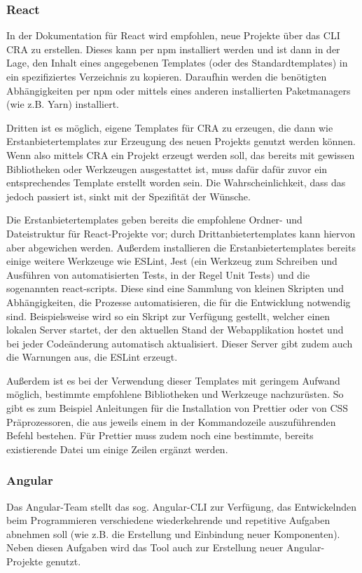 \subsubsection{React}
In der Dokumentation für React wird empfohlen, neue Projekte über das \gls{CLI} \gls{CRA} zu erstellen. Dieses kann per \gls{npm} installiert werden und ist dann in der Lage, den Inhalt eines angegebenen Templates (oder des Standardtemplates) in ein spezifiziertes Verzeichnis zu kopieren. Daraufhin werden die benötigten Abhängigkeiten per \gls{npm} oder mittels eines anderen installierten Paketmanagers (wie z.B. Yarn) installiert.

Dritten ist es möglich, eigene Templates für \gls{CRA} zu erzeugen, die dann wie Erstanbietertemplates zur Erzeugung des neuen Projekts genutzt werden können. Wenn also mittels \gls{CRA} ein Projekt erzeugt werden soll, das bereits mit gewissen Bibliotheken oder Werkzeugen ausgestattet ist, muss dafür dafür zuvor ein entsprechendes Template erstellt worden sein. Die Wahrscheinlichkeit, dass das jedoch passiert ist, sinkt mit der Spezifität der Wünsche.

Die Erstanbietertemplates geben bereits die empfohlene Ordner- und Dateistruktur für React-Projekte vor; durch Drittanbietertemplates kann hiervon aber abgewichen werden. Außerdem installieren die Erstanbietertemplates bereits einige weitere Werkzeuge wie ESLint, Jest (ein Werkzeug zum Schreiben und Ausführen von automatisierten Tests, in der Regel Unit Tests) und die sogenannten react-scripts. Diese sind eine Sammlung von kleinen Skripten und Abhängigkeiten, die Prozesse automatisieren, die für die Entwicklung notwendig sind. Beispielsweise wird so ein Skript zur Verfügung gestellt, welcher einen lokalen Server startet, der den aktuellen Stand der Webapplikation hostet und bei jeder Codeänderung automatisch aktualisiert. Dieser Server gibt zudem auch die Warnungen aus, die ESLint erzeugt.

Außerdem ist es bei der Verwendung dieser Templates mit geringem Aufwand möglich, bestimmte empfohlene Bibliotheken und Werkzeuge nachzurüsten. So gibt es zum Beispiel Anleitungen für die Installation von Prettier oder von CSS Präprozessoren, die aus jeweils einem in der Kommandozeile auszuführenden Befehl bestehen. Für Prettier muss zudem noch eine bestimmte, bereits existierende Datei um einige Zeilen ergänzt werden.

\subsubsection{Angular}
Das Angular-Team stellt das sog. Angular-CLI zur Verfügung, das Entwickelnden beim Programmieren verschiedene wiederkehrende und repetitive Aufgaben abnehmen soll (wie z.B. die Erstellung und Einbindung neuer Komponenten). Neben diesen Aufgaben wird das Tool auch zur Erstellung neuer Angular-Projekte genutzt.

